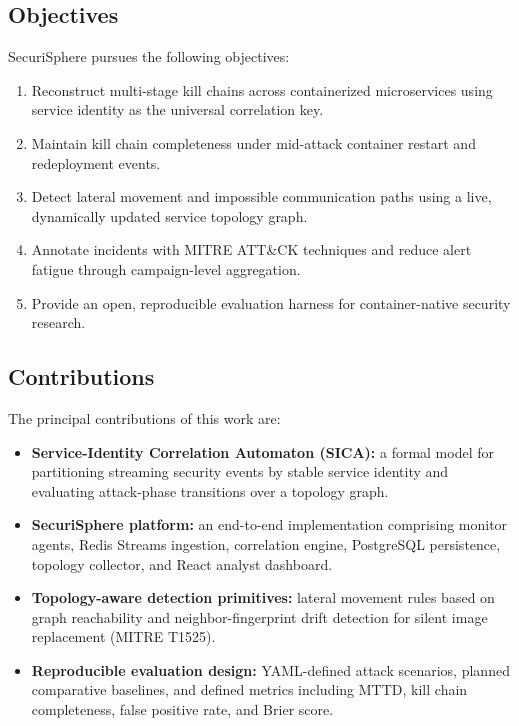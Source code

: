 \documentclass[conference]{IEEEtran}
\begin{document}
\subsection{Objectives}
SecuriSphere pursues the following objectives:
\begin{enumerate}
    \item Reconstruct multi-stage kill chains across containerized
    microservices using service identity as the universal correlation key.
    \item Maintain kill chain completeness under mid-attack container
    restart and redeployment events.
    \item Detect lateral movement and impossible communication paths using
    a live, dynamically updated service topology graph.
    \item Annotate incidents with MITRE ATT\&CK techniques and reduce
    alert fatigue through campaign-level aggregation.
    \item Provide an open, reproducible evaluation harness for
    container-native security research.
\end{enumerate}

\subsection{Contributions}
The principal contributions of this work are:
\begin{itemize}
    \item \textbf{Service-Identity Correlation Automaton (SICA):} a formal
    model for partitioning streaming security events by stable service
    identity and evaluating attack-phase transitions over a topology graph.
    \item \textbf{SecuriSphere platform:} an end-to-end implementation
    comprising monitor agents, Redis Streams ingestion, correlation engine,
  PostgreSQL persistence, topology collector, and React analyst dashboard.
    \item \textbf{Topology-aware detection primitives:} lateral movement
    rules based on graph reachability and neighbor-fingerprint drift
    detection for silent image replacement (MITRE T1525).
    \item \textbf{Reproducible evaluation design:} YAML-defined attack
    scenarios, planned comparative baselines, and defined metrics including
    MTTD, kill chain completeness, false positive rate, and Brier score.
\end{itemize}
\end{document}
